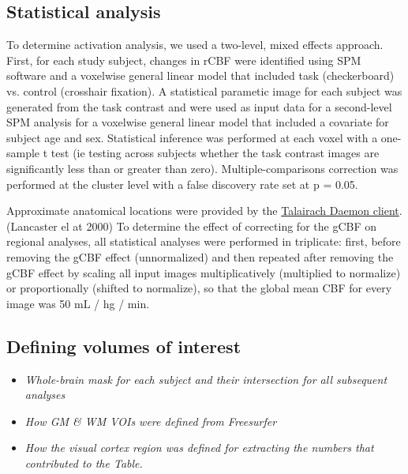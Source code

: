 \subsection{Statistical analysis}
To determine activation analysis, we used a two-level, mixed effects approach.  First, for each study subject, changes in rCBF were identified using SPM software and a voxelwise general linear model that included task (checkerboard) vs. control (crosshair fixation). A statistical parametic image for each subject was generated from the task contrast and were used as input data for a second-level SPM analysis for a voxelwise general linear model that included a covariate for subject age and sex. Statistical inference was performed at each voxel with a one-sample t test (ie testing across subjects whether the task contrast images are significantly less than or greater than zero). 
Multiple-comparisons correction was performed at the cluster level with a false discovery rate set at p = 0.05. 

Approximate anatomical locations were provided by the \href{http://www.talairach.org}{Talairach Daemon client}.(Lancaster el at 2000)
To determine the effect of correcting for the gCBF on regional analyses, all statistical analyses were performed in triplicate: first, before removing the gCBF effect (unnormalized) and then repeated after removing the gCBF effect by scaling all input images multiplicatively (multiplied to normalize) or proportionally (shifted to normalize), so that the global mean CBF for every image was 50 mL / hg / min.


\subsection{Defining volumes of interest}
\begin{itemize}
\item \textit{Whole-brain mask for each subject and their intersection for all subsequent analyses}
\item \textit{How GM & WM VOIs were defined from Freesurfer}
\item \textit{How the visual cortex region was defined for extracting the numbers that contributed to the Table.}
\end{itemize}






